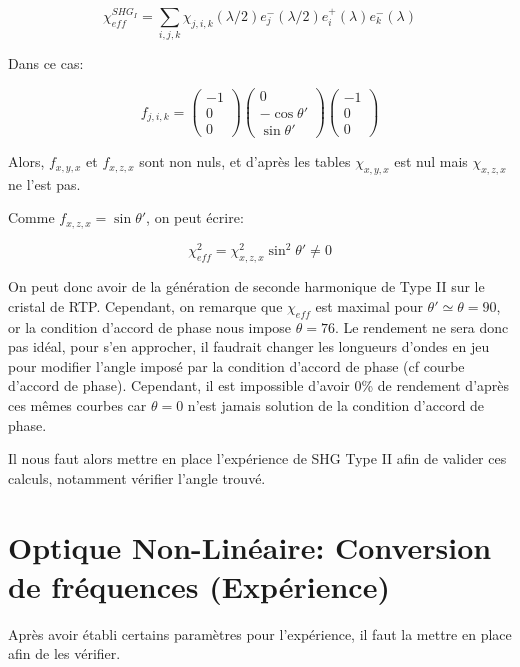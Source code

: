 \documentclass[a4paper,11pt]{report}
\begin{document}
\[\chi_{eff}^{SHG_I}=\sum_{i,j,k}\chi_{j,i,k}(\lambda/2)e^-_j(\lambda/2)e^+_i(\lambda)e^-_k(\lambda)\]

Dans ce cas:

\[f_{j,i,k}=\begin{pmatrix}-1\\0\\0\end{pmatrix}\begin{pmatrix}0\\-\cos\theta'\\\sin\theta'\end{pmatrix}\begin{pmatrix}-1\\0\\0\end{pmatrix}\]

Alors, $f_{x,y,x}$ et $f_{x,z,x}$ sont non nuls, et d'après les tables $\chi_{x,y,x}$ est nul mais $\chi_{x,z,x}$ ne l'est pas. 

Comme $f_{x,z,x}=\sin\theta'$, on peut écrire:

\[\chi_{eff}^2=\chi_{x,z,x}^2\sin^2\theta'\neq 0\]

On peut donc avoir de la génération de seconde harmonique de Type II sur le cristal de RTP. Cependant, on remarque que $\chi_{eff}$ est maximal pour $\theta'\simeq\theta=90$\textdegree, or la condition d'accord de phase nous impose $\theta=76$\textdegree. Le rendement ne sera donc pas idéal, pour s'en approcher, il faudrait changer les longueurs d'ondes en jeu pour modifier l'angle imposé par la condition d'accord de phase (cf courbe d'accord de phase). Cependant, il est impossible d'avoir 0\% de rendement d'après ces mêmes courbes car $\theta=0$ n'est jamais solution de la condition d'accord de phase.

Il nous faut alors mettre en place l'expérience de SHG Type II afin de valider ces calculs, notamment vérifier l'angle trouvé.

\chapter{Optique Non-Linéaire: Conversion de fréquences (Expérience)} \label{ONLExp}
Après avoir établi certains paramètres pour l'expérience, il faut la mettre en place afin de les vérifier.
\end{document}

